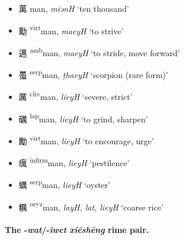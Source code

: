\begin{itemize}
  \item {\Large{萬}} %
    {\large{man}},
    \textit{miənH} `ten thousand' %

  \item {\Large{勱}} %
    {\large{{\textsuperscript{virt}}man}},
    \textit{maeyH} `to strive' %

  \item {\Large{邁}} %
    {\large{{\textsuperscript{amb}}man}},
    \textit{maeyH} `to stride, move forward' %

  \item {\Large{蠆}} %
    {\large{{\textsuperscript{serp}}man}},
    \textit{ṭhaeyH} `scorpion (rare form)' %

  \item {\Large{厲}} %
    {\large{{\textsuperscript{cliv}}man}},
    \textit{lieyH} `severe, strict' %

  \item {\Large{礪}} %
    {\large{{\textsuperscript{lap}}man}},
    \textit{lieyH} `to grind, sharpen' %

  \item {\Large{勵}} %
    {\large{{\textsuperscript{virt}}man}},
    \textit{lieyH} `to encourage, urge' %

  \item {\Large{癘}} %
    {\large{{\textsuperscript{infirm}}man}},
    \textit{lieyH} `pestilence' %


  \item {\Large{蠣}} %
    {\large{{\textsuperscript{serp}}man}},
    \textit{lieyH} `oyster' %

  \item {\Large{糲}} %
    {\large{{\textsuperscript{oryz}}man}},
    \textit{layH, lat, lieyH} `coarse rice' %
\end{itemize}




\paragraph{The -\textit{wat}/-\textit{iwet} \textit{xiéshēng} rime pair.}
\label{par:wat-iwet-XS-pair}


